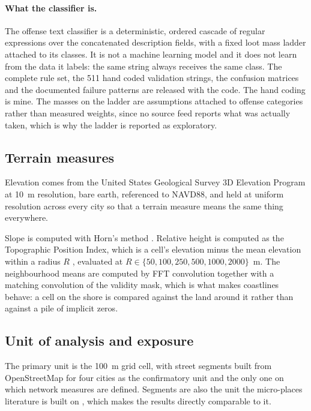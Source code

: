 \documentclass[12pt,letterpaper]{article}
\begin{document}
\paragraph{What the classifier is.} The offense text classifier is a deterministic,
ordered cascade of regular expressions over the concatenated description fields, with
a fixed loot mass ladder attached to its classes. It is not a machine learning model
and it does not learn from the data it labels: the same string always receives the
same class. The complete rule set, the 511 hand coded validation strings, the
confusion matrices and the documented failure patterns are released with the code.
The hand coding is mine. The masses on the ladder are assumptions attached to offense
categories rather than measured weights, since no source feed reports what was
actually taken, which is why the ladder is reported as exploratory.

\subsection{Terrain measures}

Elevation comes from the United States Geological Survey 3D Elevation Program at
10~m resolution, bare earth, referenced to NAVD88, and held at uniform resolution
across every city so that a terrain measure means the same thing everywhere.

Slope is computed with Horn's method \citep{horn1981}. Relative height is computed as the Topographic
Position Index, which is a cell's elevation minus the mean elevation within a radius
$R$ \citep{weiss2001}, evaluated at $R \in \{50, 100, 250, 500, 1000, 2000\}$~m. The
neighbourhood means are computed by FFT convolution together with a matching
convolution of the validity mask, which is what makes coastlines behave: a cell on
the shore is compared against the land around it rather than against a pile of
implicit zeros.

\subsection{Unit of analysis and exposure}

The primary unit is the 100~m grid cell, with street segments built from OpenStreetMap
for four cities as the confirmatory unit and the only one on which network measures
are defined. Segments are also the unit the micro-places literature is built on
\citep{weisburd2015}, which makes the results directly comparable to it.
\end{document}
